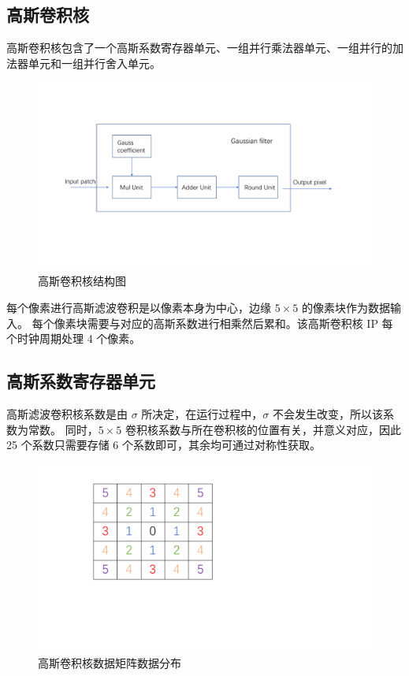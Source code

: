 \documentclass[12pt, a4paper, oneside]{ctexbook}
\begin{document}
	\subsection{高斯卷积核}
	高斯卷积核包含了一个高斯系数寄存器单元、一组并行乘法器单元、一组并行的加法器单元和一组并行舍入单元。
		\begin{figure}[h]
			\centering
			\includegraphics[scale=0.55]{pic/gaussian_filter}
			\caption{高斯卷积核结构图}
			\label{fig:gaussianfilter}
		\end{figure}
	每个像素进行高斯滤波卷积是以像素本身为中心，边缘 $5\times5$ 的像素块作为数据输入。
	每个像素块需要与对应的高斯系数进行相乘然后累和。该高斯卷积核 IP 每个时钟周期处理 4 个像素。
	\subsection{高斯系数寄存器单元}
	高斯滤波卷积核系数是由 $\sigma$ 所决定，在运行过程中，$\sigma$ 不会发生改变，所以该系数为常数。
	同时，$5\times5$ 卷积核系数与所在卷积核的位置有关，并意义对应，因此25 个系数只需要存储 6 个系数即可，其余均可通过对称性获取。
	\begin{figure}[h]
		\centering
		\includegraphics[scale=0.4]{pic/number}
		\caption{高斯卷积核数据矩阵数据分布}
		\label{fig:number}
	\end{figure}
\end{document}

